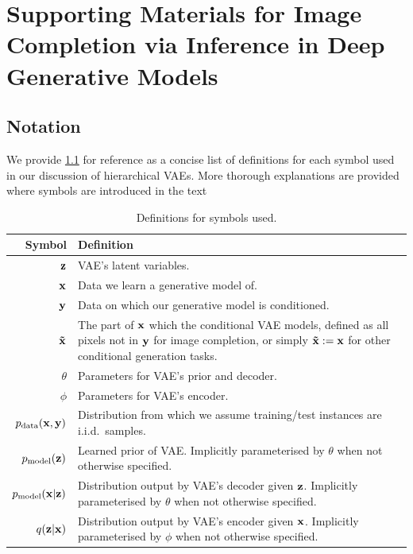 \chapter{Supporting Materials for Image Completion via Inference in Deep Generative Models}

\section{Notation}
We provide \cref{tab:cigcvae-notation} for reference as a concise list of definitions
for each symbol used in our discussion of hierarchical VAEs. More thorough explanations are provided where symbols are
introduced in the text

\begin{table}
  \caption{Definitions for symbols used.}
  \label{tab:cigcvae-notation}
  \centering
  \begin{tabular}{rp{11cm}}
    \toprule
    Symbol    & Definition   \\
    \midrule
    $\mathbf{z}{}$                                   & VAE's latent variables. \\
    $\mathbf{x}{}$                                & Data we learn a generative model of. \\
    $\mathbf{y}{}$                            & Data on which our generative model is conditioned. \\
    $\mathbf{\tilde{x}}{}$                           & The part of $\mathbf{x}{}$ which the conditional VAE models, defined as all pixels not in $\mathbf{y}{}$ for image completion, or simply $\mathbf{\tilde{x}} := \mathbf{x}{}$ for other conditional generation tasks. \\
    $\theta$                              & Parameters for VAE's prior and decoder. \\
    $\phi$                                & Parameters for VAE's encoder. \\
    $p_{\rm{data}}{}(\mathbf{x}{}, \mathbf{y}{})$            & Distribution from which we assume training/test instances are i.i.d.~samples. \\
    $p_{\rm{model}}{}(\mathbf{z}{})$                        & Learned prior of VAE. Implicitly parameterised by $\theta$ when not otherwise specified. \\
    $p_{\rm{model}}{}(\mathbf{x}{}|\mathbf{z}{})$                   & Distribution output by VAE's decoder given $\mathbf{z}{}$. Implicitly parameterised by $\theta$ when not otherwise specified. \\
    $q(\mathbf{z}{}|\mathbf{x}{})$                           & Distribution output by VAE's encoder given $\mathbf{x}{}$. Implicitly parameterised by $\phi$ when not otherwise specified. \\

\end{tabular}
\end{table}
